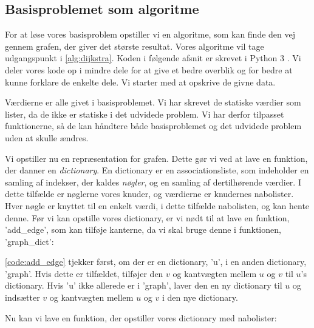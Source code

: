 \subsection{Basisproblemet som algoritme}
For at løse vores basisproblem opstiller vi en algoritme, som kan finde den vej gennem grafen, der giver det største resultat. Vores algoritme vil tage udgangspunkt i \autoref{alg:dijkstra}. Koden i følgende afsnit er skrevet i Python 3 \citep{dijkpython}. Vi deler vores kode op i mindre dele for at give et bedre overblik og for bedre at kunne forklare de enkelte dele. Vi starter med at opskrive de givne data.



Værdierne er alle givet i basisproblemet. Vi har skrevet de statiske værdier som lister, da de ikke er statiske i det udvidede problem. Vi har derfor tilpasset funktionerne, så de kan håndtere både basisproblemet og det udvidede problem uden at skulle ændres.

Vi opstiller nu en repræsentation for grafen. Dette gør vi ved at lave en funktion, der danner en \emph{dictionary}. En dictionary er en associationsliste, som indeholder en samling af indekser, der kaldes \emph{nøgler}, og en samling af dertilhørende værdier. I dette tilfælde er nøglerne vores knuder, og
værdierne er knudernes nabolister. Hver nøgle er knyttet til en enkelt værdi, i dette tilfælde nabolisten, og kan hente denne. Før vi kan opstille vores dictionary, er vi nødt til at lave en funktion, 'add\_edge', som kan tilføje kanterne, da vi skal bruge denne i funktionen, 'graph\_dict':



\autoref{code:add_edge} tjekker først, om der er en dictionary, 'u', i en anden dictionary, 'graph'. Hvis dette er tilfældet, tilføjer den $v$ og kantvægten mellem $u$ og $v$ til  $u$'s dictionary. Hvis 'u' ikke allerede er i 'graph', laver den en ny dictionary til $u$ og indsætter $v$ og kantvægten mellem $u$ og $v$ i den nye dictionary.

Nu kan vi lave en funktion, der opstiller vores dictionary med nabolister:



